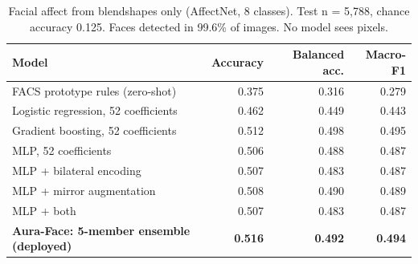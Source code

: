 \begin{table}[t]
\centering
\footnotesize
\caption{Facial affect from blendshapes only (AffectNet, 8 classes). Test n = 5,788, chance accuracy 0.125. Faces detected in 99.6\% of images. No model sees pixels.}
\label{tab:face}
\setlength{\tabcolsep}{4pt}
\begin{tabular}{lrrr}
\toprule
\textbf{Model} & \textbf{Accuracy} & \textbf{Balanced acc.} & \textbf{Macro-F1} \\
\midrule
FACS prototype rules (zero-shot) & 0.375 & 0.316 & 0.279 \\
Logistic regression, 52 coefficients & 0.462 & 0.449 & 0.443 \\
Gradient boosting, 52 coefficients & 0.512 & 0.498 & 0.495 \\
MLP, 52 coefficients & 0.506 & 0.488 & 0.487 \\
MLP + bilateral encoding & 0.507 & 0.483 & 0.487 \\
MLP + mirror augmentation & 0.508 & 0.490 & 0.489 \\
MLP + both & 0.507 & 0.483 & 0.487 \\
\textbf{Aura-Face: 5-member ensemble (deployed)} & \textbf{0.516} & \textbf{0.492} & \textbf{0.494} \\
\bottomrule
\end{tabular}
\end{table}
